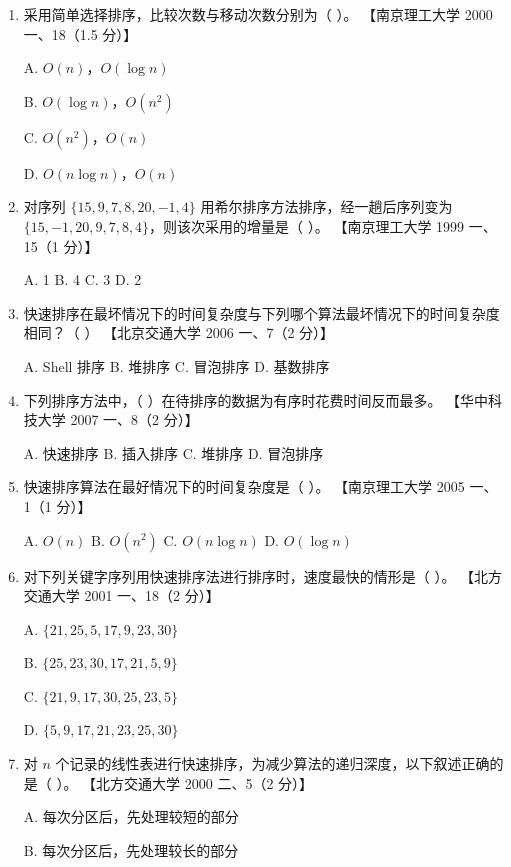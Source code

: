 \documentclass[lang=cn,newtx,10pt,scheme=chinese]{elegantbook}
\begin{document}
\begin{enumerate}
    \item 采用简单选择排序，比较次数与移动次数分别为（ ）。  
    【南京理工大学 2000 一、18（1.5 分）】  

    A. $O(n)$，$O(\log n)$  

    B. $O(\log n)$，$O(n^2)$  

    C. $O(n^2)$，$O(n)$  

    D. $O(n \log n)$，$O(n)$  

    \item 对序列 $\{15, 9, 7, 8, 20, -1, 4\}$ 用希尔排序方法排序，经一趟后序列变为 $\{15, -1, 20, 9, 7, 8, 4\}$，则该次采用的增量是（ ）。  
    【南京理工大学 1999 一、15（1 分）】  

    A. 1 \quad B. 4 \quad C. 3 \quad D. 2  

    \item 快速排序在最坏情况下的时间复杂度与下列哪个算法最坏情况下的时间复杂度相同？（ ）  
    【北京交通大学 2006 一、7（2 分）】  

    A. Shell 排序 \quad B. 堆排序 \quad C. 冒泡排序 \quad D. 基数排序  

    \item 下列排序方法中，（ ）在待排序的数据为有序时花费时间反而最多。  
    【华中科技大学 2007 一、8（2 分）】  

    A. 快速排序 \quad B. 插入排序 \quad C. 堆排序 \quad D. 冒泡排序  

    \item 快速排序算法在最好情况下的时间复杂度是（ ）。  
    【南京理工大学 2005 一、1（1 分）】  

    A. $O(n)$ \quad B. $O(n^2)$ \quad C. $O(n \log n)$ \quad D. $O(\log n)$  

    \item 对下列关键字序列用快速排序法进行排序时，速度最快的情形是（ ）。  
    【北方交通大学 2001 一、18（2 分）】  

    A. $\{21, 25, 5, 17, 9, 23, 30\}$ 

    B. $\{25, 23, 30, 17, 21, 5, 9\}$  

    C. $\{21, 9, 17, 30, 25, 23, 5\}$ 
    
    D. $\{5, 9, 17, 21, 23, 25, 30\}$  

    \item 对 $n$ 个记录的线性表进行快速排序，为减少算法的递归深度，以下叙述正确的是（ ）。  
    【北方交通大学 2000 二、5（2 分）】  

    A. 每次分区后，先处理较短的部分  

    B. 每次分区后，先处理较长的部分  


\end{enumerate}
\end{document}
